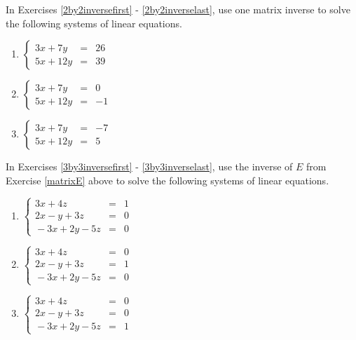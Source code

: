 In Exercises \ref{2by2inversefirst} - \ref{2by2inverselast}, use one matrix inverse to solve the following systems of linear equations.

\begin{multicols}{3}
\begin{enumerate}
\setcounter{enumi}{\value{HW}}

\item $\left\{ \begin{array}{rcr}   3x + 7y & = & 26 \\ 5x + 12y & = & 39  \end{array} \right.$ \label{2by2inversefirst}
\item $\left\{ \begin{array}{rcr}   3x + 7y & = &  0 \\ 5x + 12y & = & -1  \end{array} \right.$
\item $\left\{ \begin{array}{rcr}   3x + 7y & = & -7 \\ 5x + 12y & = &  5  \end{array} \right.$ \label{2by2inverselast}


\setcounter{HW}{\value{enumi}}
\end{enumerate}
\end{multicols}


In Exercises \ref{3by3inversefirst} - \ref{3by3inverselast}, use the inverse of $E$ from Exercise \ref{matrixE} above to solve the following systems of linear equations.

\begin{multicols}{3}
\begin{enumerate}
\setcounter{enumi}{\value{HW}}

\item $\left\{ \begin{array}{rcr}   3x + 4z & = & 1 \\ 2x - y + 3z & = & 0 \\ \!-3x + 2y - 5z & = & 0  \end{array} \right.$ \label{3by3inversefirst}
\item $\left\{ \begin{array}{rcr}   3x + 4z & = & 0 \\ 2x - y + 3z & = & 1 \\ \!-3x + 2y - 5z & = & 0  \end{array} \right.$
\item $\left\{ \begin{array}{rcr}   3x + 4z & = & 0 \\ 2x - y + 3z & = & 0 \\ \!-3x + 2y - 5z & = & 1  \end{array} \right.$ \label{3by3inverselast}

\setcounter{HW}{\value{enumi}}
\end{enumerate}
\end{multicols}

